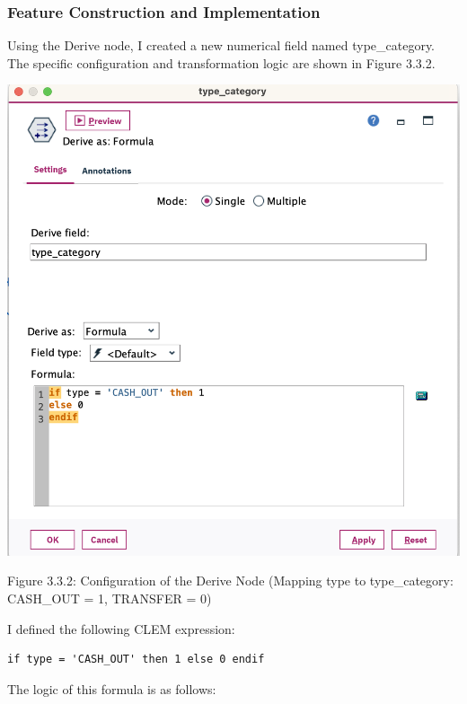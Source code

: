 \documentclass[sigplan,screen]{acmart}
\begin{document}
\vspace{0.3cm}

\subsubsection{ Feature Construction and Implementation}

Using the Derive node, I created a new numerical field named type\_category. The specific configuration and transformation logic are shown in Figure 3.3.2.

\vspace{0.3cm}

\begin{center}
\includegraphics[width=0.9\columnwidth]{3.3.2.png}
\vspace{0.2cm}

Figure 3.3.2: Configuration of the Derive Node (Mapping type to type\_category: CASH\_OUT = 1, TRANSFER = 0)
\end{center}

\vspace{0.3cm}

I defined the following CLEM expression:

\begin{verbatim}
if type = 'CASH_OUT' then 1 else 0 endif  
\end{verbatim}

The logic of this formula is as follows:
\end{document}
